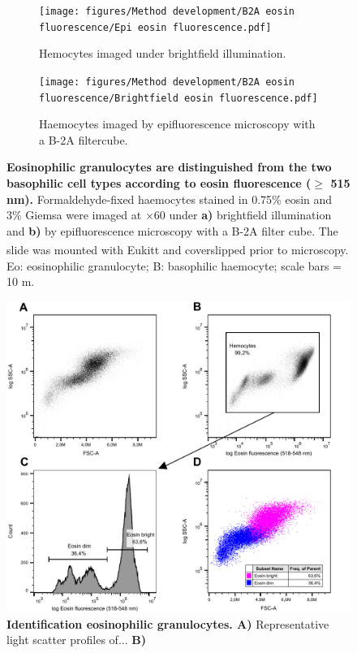\begin{figure}[H]
    \centering
    \begin{subfigure}[b]{.45\textwidth}
        \centering
        \texttt{[image: figures/Method development/B2A eosin fluorescence/Epi eosin fluorescence.pdf]}
        \caption{Hemocytes imaged under brightfield illumination.}
        \label{ffig:a}
    \end{subfigure}
    \hfill
    \begin{subfigure}[b]{.45\textwidth}
        \centering
        \texttt{[image: figures/Method development/B2A eosin fluorescence/Brightfield eosin fluorescence.pdf]}
        \caption{Haemocytes imaged by epifluorescence microscopy with a B-2A filtercube.}
        \label{ffig:b}
    \end{subfigure}
    \caption{\textbf{Eosinophilic granulocytes are distinguished from the two basophilic cell types according to eosin fluorescence ($\geq$ 515 nm).} Formaldehyde-fixed haemocytes stained in 0.75\% eosin and 3\% Giemsa were imaged at $\times$60 under \textbf{a)} brightfield illumination and \textbf{b)} by epifluorescence microscopy with a B-2A filter cube. The slide was mounted with Eukitt\textsuperscript{\textregistered} and coverslipped prior to microscopy. Eo: eosinophilic granulocyte; B: basophilic haemocyte; scale bars = 10 \micro m. }
    \label{fig:Eosin_fluorescence_B2A}
\end{figure}


\begin{figure}[!ht]
    \centering
    \includegraphics[width=.73\textwidth]{figures/Method development/Eosin exp rastered.pdf}
    \caption{\textbf{Identification eosinophilic granulocytes. A)} Representative light scatter profiles of... \textbf{B)} }
    \label{fig:eosin_exp2}
\end{figure}

